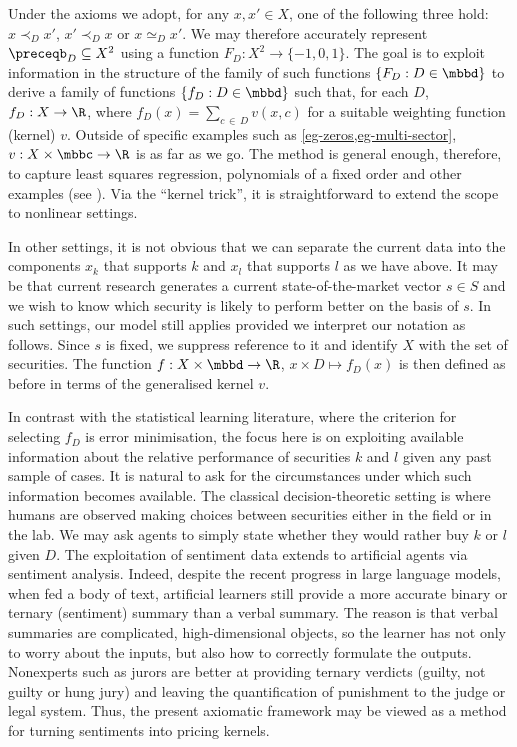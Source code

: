 
Under the axioms we adopt, for any $x, x' \in X$, one of the following three
hold: $x \prec_D x'$, $x' \prec_D x$ or $x \simeq_D x'$. We may therefore
accurately represent $\preceqb_D \subseteq X^2$ using a function $F_D: X^2
\rightarrow \{-1, 0, 1\}$. The goal is to exploit information in the structure
of the family of such functions $\{F_D: D \in \mbbd\}$ to derive a family of
functions $\{f_D: D \in \mbbd\}$ such that, for each $D$, $f_D: X \rightarrow
\R$, where $f_D(x) = \sum_{c\, \in \,D} v(x, c)$ for a suitable weighting
function (kernel) $v$. Outside of specific examples such as
\cref{eg-zeros,eg-multi-sector}, $v: X \times \mbbc \rightarrow \R$ is as far
as we go. The method is general enough, therefore, to capture least squares
regression, polynomials of a fixed order and other examples (see \citet[page
10]{Cucker-Smale}). Via the ``kernel trick'', it is straightforward to extend
the scope to nonlinear settings.

In other settings, it is not obvious that we can separate the current data into
the components $x_k$ that supports $k$ and $x_l$ that supports $l$ as we have
above. It may be that current research generates a current state-of-the-market
vector $s \in S$ and we wish to know which security is likely to perform better
on the basis of $s$. In such settings, our model still applies provided we
interpret our notation as follows. Since $s$ is fixed, we suppress reference to
it and identify $X$ with the set of securities. The function $f: X \times \mbbd
\rightarrow \R$, $x \times D \mapsto f_D(x)$ is then defined as before in terms
of the generalised kernel $v$. 

In contrast with the statistical learning literature, where the criterion for
selecting $f_D$ is error minimisation, the focus here is on exploiting
available information about the relative performance of securities $k$ and $l$
given any past sample of cases. It is natural to ask for the circumstances
under which such information becomes available. The classical
decision-theoretic setting is where humans are observed making choices between
securities either in the field or in the lab. We may ask agents to simply state
whether they would rather buy $k$ or $l$ given $D$. The exploitation of
sentiment data extends to artificial agents via sentiment analysis. Indeed,
despite the recent progress in large language models, when fed a body of text,
artificial learners still provide a more accurate binary or ternary (sentiment)
summary than a verbal summary. The reason is that verbal summaries are
complicated, high-dimensional objects, so the learner has not only to worry
about the inputs, but also how to correctly formulate the outputs.  Nonexperts
such as jurors are better at providing ternary verdicts (guilty, not guilty or
hung jury) and leaving the quantification of punishment to the judge or legal
system.  Thus, the present axiomatic framework may be viewed as a method for
turning sentiments into pricing kernels.



